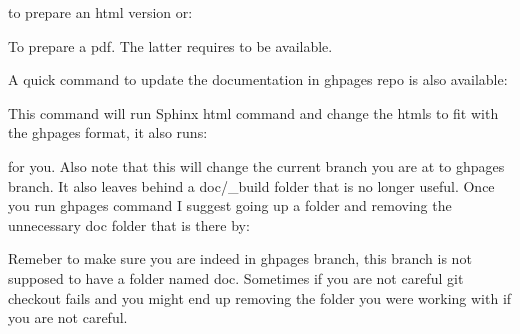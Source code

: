 \documentclass[letterpaper,10pt,english]{sphinxmanual}
\begin{document}
\begin{sphinxVerbatim}[commandchars=\\\{\}]
 
\end{sphinxVerbatim}

to prepare an html version or:

\begin{sphinxVerbatim}[commandchars=\\\{\}]
 
\end{sphinxVerbatim}

To prepare a pdf. The latter requires  to be available.

A quick command to update the documentation in gh\sphinxhyphen{}pages repo is also available:

\begin{sphinxVerbatim}[commandchars=\\\{\}]
 
\end{sphinxVerbatim}

This command will run Sphinx html command and change the htmls to fit with the gh\sphinxhyphen{}pages
format, it also runs:

\begin{sphinxVerbatim}[commandchars=\\\{\}]
  
  
 
\end{sphinxVerbatim}

for you. Also note that this will change the current branch you are at to gh\sphinxhyphen{}pages
branch. It also leaves behind a doc/\_build folder that is no longer useful. Once you run
ghpages command I suggest going up a folder and removing the unnecessary doc folder
that is there by:

\begin{sphinxVerbatim}[commandchars=\\\{\}]
 
  
\end{sphinxVerbatim}

Remeber to make sure you are indeed in gh\sphinxhyphen{}pages branch, this branch is not supposed to have
a folder named doc. Sometimes if you are not careful git checkout fails and you might end up
removing the folder you were working with if you are not careful.
\end{document}
